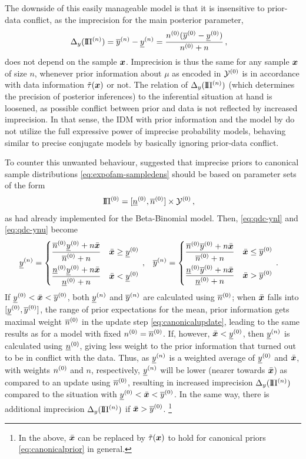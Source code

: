 The downside of this easily manageable model is that it is insensitive to prior-data conflict,
as the imprecision for the main posterior parameter,
\begin{align}
\label{eq:deltay}
\Delta_y(\text{I}\!\Pi^{(n)}) &=  \overline{y}^{(n)} - \underline{y}^{(n)} = \frac{n^{(0)} (\overline{y}^{(0)} - \underline{y}^{(0)})}{n^{(0)} +n}\,,
\end{align}
does not depend on the sample ${\bm x}$.
Imprecision is thus the same for any sample ${\bm x}$ of size $n$,
whenever prior information about $\mu$ as encoded in $\mathcal{Y}^{(0)}$ is in accordance with data information $\tilde{\tau}({\bm x})$ or not.
The relation of $\Delta_y(\text{I}\!\Pi^{(n)})$ (which determines the precision of posterior inferences) to the inferential situation at hand is loosened,
as possible conflict between prior and data is not reflected by increased imprecision.
In that sense, the IDM with prior information and the model by \textcite{2005:quaeghebeurcooman}
do not utilize the full expressive power of imprecise probability models,
behaving similar to precise conjugate models by basically ignoring prior-data conflict.

To counter this unwanted behaviour,
\textcite{Walter2009a} suggested that imprecise priors to canonical sample distributions \eqref{eq:expofam-sampledens}
should be based on parameter sets of the form
\begin{align}
\label{equ:rectparamset}
\text{I}\!\Pi^{(0)} &= [\underline{n}^{(0)}, \overline{n}^{(0)}] \times \mathcal{Y}^{(0)}\,,
\end{align}
as \textcite[\S 5.4.3]{1991:walley} had already implemented for the Beta-Binomial model.
Then, \eqref{eq:qdc-ynl} and \eqref{eq:qdc-ynu} become
\begin{align*}
\underline{y}^{(n)} &= \begin{cases} \dfrac{\overline{n}^{(0)}\underline{y}^{(0)} + n\bar{{\bm x}}}{\overline{n}^{(0)} + n} & \bar{{\bm x}} \geq \underline{y}^{(0)} \\[2ex]
                      \dfrac{\underline{n}^{(0)}\underline{y}^{(0)} + n\bar{{\bm x}}}{\underline{n}^{(0)} + n} & \bar{{\bm x}} <    \underline{y}^{(0)} \end{cases}\,, &
\overline{y}^{(n)} &= \begin{cases} \dfrac{\overline{n}^{(0)}\overline{y}^{(0)} + n\bar{{\bm x}}}{\overline{n}^{(0)} + n} & \bar{{\bm x}} \leq \overline{y}^{(0)} \\[2ex]
                      \dfrac{\underline{n}^{(0)}\overline{y}^{(0)} + n\bar{{\bm x}}}{\underline{n}^{(0)} + n} & \bar{{\bm x}} >    \overline{y}^{(0)} \end{cases}\,.
\end{align*}
If $\underline{y}^{(0)} < \bar{{\bm x}} < \overline{y}^{(0)}$, both $\underline{y}^{(n)}$ and $\overline{y}^{(n)}$ are calculated using $\overline{n}^{(0)}$;
when $\bar{{\bm x}}$ falls into $[\underline{y}^{(0)}, \overline{y}^{(0)}]$, the range of prior expectations for the mean,
prior information gets maximal weight $\overline{n}^{(0)}$ in the update step \eqref{eq:canonicalupdate},
leading to the same results as for a model with fixed $n^{(0)} = \overline{n}^{(0)}$.
If, however, $\bar{{\bm x}} < \underline{y}^{(0)}$, then $\underline{y}^{(n)}$ is calculated using $\underline{n}^{(0)}$,
giving less weight to the prior information that turned out to be in conflict with the data.
Thus, as $\underline{y}^{(n)}$ is a weighted average of $\underline{y}^{(0)}$ and $\bar{{\bm x}}$, with weights $n^{(0)}$ and $n$, respectively,
$\underline{y}^{(n)}$ will be lower (nearer towards $\bar{{\bm x}}$) as compared to an update using $\overline{n}^{(0)}$,
resulting in increased imprecision $\Delta_y(\text{I}\!\Pi^{(n)})$ compared to the situation with $\underline{y}^{(0)} < \bar{{\bm x}} < \overline{y}^{(0)}$.
In the same way, there is additional imprecision $\Delta_y(\text{I}\!\Pi^{(n)})$ if $\bar{{\bm x}} > \overline{y}^{(0)}$.%
\footnote{In the above, $\bar{{\bm x}}$ can be replaced by $\tilde{\tau}({\bm x})$
to hold for canonical priors \eqref{eq:canonicalprior} in general.}

